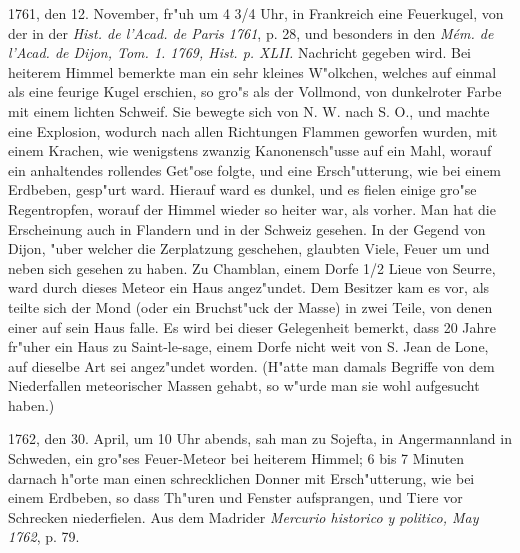 \documentclass[a4paper, 11pt, oneside, polutonikogreek, german]{article}
\begin{document}
1761, den 12. November, fr"uh um 4 3/4 Uhr, in Frankreich eine Feuerkugel, von der in der \emph{Hist. de l'Acad. de Paris 1761}, p. 28, und besonders in den \emph{Mém. de l'Acad. de Dijon, Tom. 1. 1769, Hist. p. XLII.} Nachricht gegeben wird. Bei heiterem Himmel bemerkte man ein sehr kleines W"olkchen, welches auf einmal als eine feurige Kugel erschien, so gro"s als der Vollmond, von dunkelroter Farbe mit einem lichten Schweif. Sie bewegte sich von N. W. nach S. O., und machte eine Explosion, wodurch nach allen Richtungen Flammen geworfen wurden, mit einem Krachen, wie wenigstens zwanzig Kanonensch"usse auf ein Mahl, worauf ein anhaltendes rollendes Get"ose folgte, und eine Ersch"utterung, wie bei einem Erdbeben, gesp"urt ward. Hierauf ward es dunkel, und es fielen einige gro"se Regentropfen, worauf der Himmel wieder so heiter war, als vorher. Man hat die Erscheinung auch in Flandern und in der Schweiz gesehen. In der Gegend von Dijon, "uber welcher die Zerplatzung geschehen, glaubten Viele, Feuer um und neben sich gesehen zu haben. Zu Chamblan, einem Dorfe 1/2 Lieue von Seurre, ward durch dieses Meteor ein Haus angez"undet. Dem Besitzer kam es vor, als teilte sich der Mond (oder ein Bruchst"uck der Masse) in zwei Teile, von denen einer auf sein Haus falle. Es wird bei dieser Gelegenheit bemerkt, dass 20 Jahre fr"uher ein Haus zu Saint-le-sage, einem Dorfe nicht weit von S. Jean de Lone, auf dieselbe Art sei angez"undet worden. (H"atte man damals Begriffe von dem Niederfallen meteorischer Massen gehabt, so w"urde man sie wohl aufgesucht haben.)

1762, den 30. April, um 10 Uhr abends, sah man zu Sojefta, in Angermannland in Schweden, ein gro"ses Feuer-Meteor bei heiterem Himmel; 6 bis 7 Minuten darnach h"orte man einen schrecklichen Donner mit Ersch"utterung, wie bei einem Erdbeben, so dass Th"uren und Fenster aufsprangen, und Tiere vor Schrecken niederfielen. Aus dem Madrider \emph{Mercurio historico y politico, May 1762}, p. 79.
\end{document}
